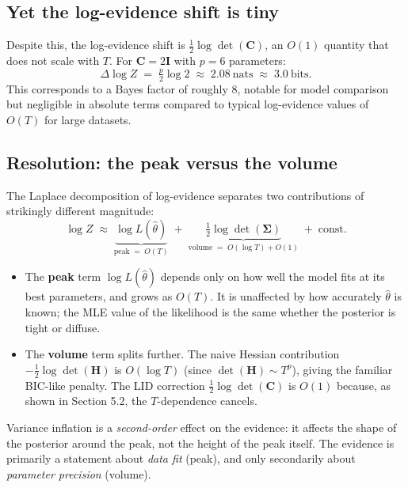 \documentclass[11pt]{article}
\begin{document}
\subsection{Yet the log-evidence shift is tiny}

Despite this, the log-evidence shift is $\tfrac{1}{2}\log\det(\mathbf C)$, an $O(1)$ quantity that does not scale with $T$. For $\mathbf C = 2\mathbf I$ with $p = 6$ parameters:
\begin{equation}
\Delta \log Z
\;=\;
\tfrac{p}{2}\log 2
\;\approx\;
2.08\ \text{nats}
\;\approx\;
3.0\ \text{bits}.
\end{equation}
This corresponds to a Bayes factor of roughly $8$, notable for model comparison but negligible in absolute terms compared to typical log-evidence values of $O(T)$ for large datasets.

\subsection{Resolution: the peak versus the volume}

The Laplace decomposition of log-evidence separates two contributions of strikingly different magnitude:
\begin{equation}
\log Z
\;\approx\;
\underbrace{\log L(\hat\theta)}_{\text{peak} \;=\; O(T)}
\;+\;
\underbrace{\tfrac{1}{2}\log\det(\boldsymbol\Sigma)}_{\text{volume} \;=\; O(\log T) + O(1)}
\;+\;
\text{const}.
\end{equation}

\begin{itemize}
\item The \textbf{peak} term $\log L(\hat\theta)$ depends only on how well the model fits at its best parameters, and grows as $O(T)$. It is unaffected by how accurately $\hat\theta$ is known; the MLE value of the likelihood is the same whether the posterior is tight or diffuse.
\item The \textbf{volume} term splits further. The naive Hessian contribution $-\tfrac{1}{2}\log\det(\mathbf H)$ is $O(\log T)$ (since $\det(\mathbf H) \sim T^p$), giving the familiar BIC-like penalty. The LID correction $\tfrac{1}{2}\log\det(\mathbf C)$ is $O(1)$ because, as shown in Section 5.2, the $T$-dependence cancels.
\end{itemize}

Variance inflation is a \emph{second-order} effect on the evidence: it affects the shape of the posterior around the peak, not the height of the peak itself. The evidence is primarily a statement about \emph{data fit} (peak), and only secondarily about \emph{parameter precision} (volume).
\end{document}

